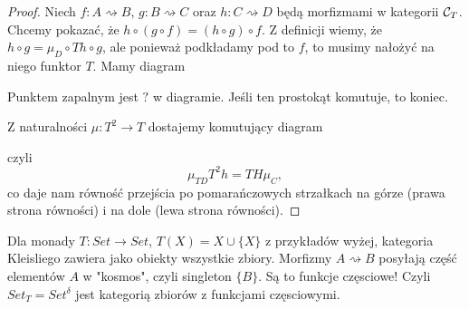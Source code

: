 \begin{proof}
  Niech $f:A\rightsquigarrow B$, $g:B\rightsquigarrow C$ oraz $h:C\rightsquigarrow D$ będą morfizmami w kategorii $\mathcal{C}_T$. Chcemy pokazać, że $h\circ (g\circ f)=(h\circ g)\circ f$. Z definicji wiemy, że $h\circ g=\mu_D\circ Th\circ g$, ale ponieważ podkładamy pod to $f$, to musimy nałożyć na niego funktor $T$. Mamy diagram 
  \begin{center}
  \end{center}
  Punktem zapalnym jest $?$ w diagramie. Jeśli ten prostokąt komutuje, to koniec. 

  Z naturalności $\mu:T^2\to T$ dostajemy komutujący diagram
  \begin{center}
  \end{center}
  czyli 
  $$\mu_{TD}T^2h=TH\mu_C,$$
  co daje nam równość przejścia po pomarańczowych strzałkach na górze (prawa strona równości) i na dole (lewa strona równości).
\end{proof}

\begin{example}
  Dla monady $T:Set\to Set$, $T(X)=X\cup\{X\}$ z przykładów wyżej, kategoria Kleisliego zawiera jako obiekty wszystkie zbiory. Morfizmy $A\rightsquigarrow B$ posyłają część elementów $A$ w "kosmos", czyli singleton $\{B\}$. Są to funkcje częsciowe! Czyli $Set_T=Set^\delta$ jest kategorią zbiorów z funkcjami częsciowymi.
\end{example}




